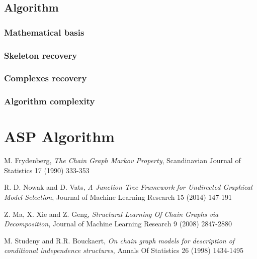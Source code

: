 \documentclass{pracamgr}
\theoremstyle{definition}
\begin{document}
	\section{Algorithm}
	
		\subsection{Mathematical basis}
				
	
		\subsection{Skeleton recovery}
				
	
		\subsection{Complexes recovery}
			
	
		\subsection{Algorithm complexity}
			
			
			
\chapter{ASP Algorithm}


\begin{thebibliography}{99}
	 M. Frydenberg, \textit{The Chain Graph Markov Property}, Scandinavian Journal of Statistics 17 (1990) 333-353	
	
	 R. D. Nowak and D. Vats, \textit{A Junction Tree Framework for Undirected Graphical Model Selection}, Journal of Machine Learning Research 15 (2014) 147-191
	
	 Z. Ma, X. Xie and Z. Geng, \textit{Structural Learning Of Chain Graphs via Decomposition}, Journal of Machine Learning Research 9 (2008) 2847-2880

	 M. Studeny and R.R. Bouckaert, \textit{On chain graph models for description of conditional independence structures}, Annals Of Statistics 26 (1998) 1434-1495
	
\end{thebibliography}
\end{document}
